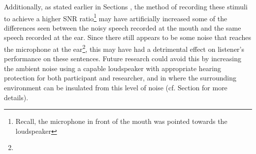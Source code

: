 Additionally, as stated earlier in Sections \DIFdelbegin \textit{\textbf{%
}%
}%
\DIFdelend \DIFaddbegin {}\DIFaddend , the method of recording these stimuli to achieve a higher SNR ratio\footnote{Recall, the microphone in front of the mouth was pointed towards the loudspeaker \DIFaddbegin {}\DIFaddend } may have artificially increased some of the differences seen between the noisy speech recorded at the mouth and the same speech recorded at the ear.  Since there still appears to be some noise that reaches the microphone at the ear\DIFdelbegin {}\DIFdelend \DIFaddbegin \footnote{}\DIFaddend , this may have had a detrimental effect on listener's performance on these sentences.  Future research could avoid this by increasing the ambient noise using a capable loudspeaker with appropriate hearing protection for both participant and researcher, and in \DIFdelbegin {}\DIFdelend \DIFaddbegin {}\DIFaddend where the surrounding environment can be insulated from this level of noise (cf. Section \DIFdelbegin \textit{\textbf{%
}%
}%
\DIFdel{\ref{ch2:limitations} }\DIFdelend \DIFaddbegin \DIFadd{\ref{chap2:limitations} }\DIFaddend for more details).




